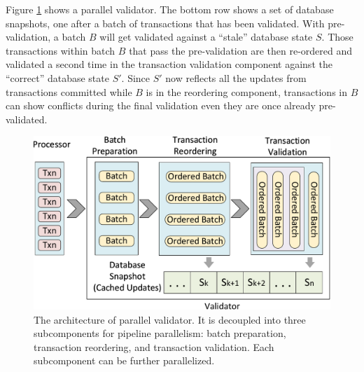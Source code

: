 Figure \ref{fig:reorder:validator} shows a parallel validator. The bottom row shows a set of database snapshots, one after a batch of transactions that has been validated. With pre-validation, a batch $B$ will get validated against a ``stale'' database state $S$. Those transactions within batch $B$ that pass the pre-validation are then re-ordered and validated a second time in the transaction validation component against the ``correct'' database state $S'$. Since $S'$ now reflects all the updates from transactions committed while $B$ is in the reordering component, transactions in $B$ can show conflicts during the final validation even  they are once already pre-validated.



\begin{figure}[h]
	\centering
	\includegraphics[width=.9\columnwidth]{./figures/validator}
	\caption{The architecture of parallel validator. It is decoupled into three subcomponents for pipeline parallelism: batch preparation, transaction reordering, and transaction validation. Each subcomponent can be further parallelized.}
	\label{fig:reorder:validator}
\end{figure}
